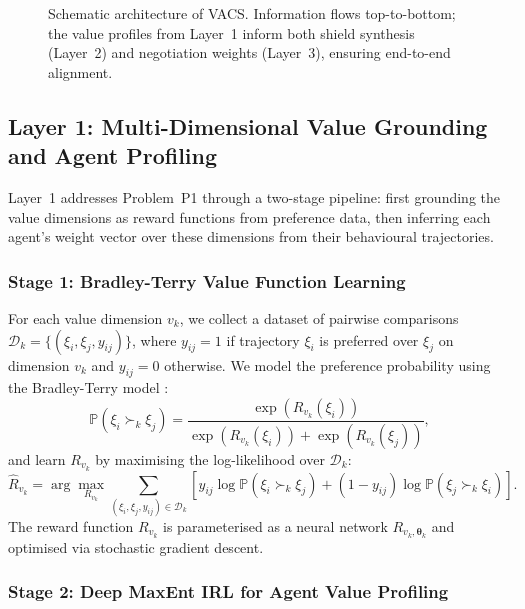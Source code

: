 \documentclass[12pt,a4paper]{article}
\newcommand{\Prob}{\mathbb{P}}
\newcommand{\calD}{\mathcal{D}}
\newcommand{\btheta}{\bm{\theta}}
\begin{document}
\begin{figure}[htbp]
\begin{tikzpicture}
  \end{tikzpicture}
  \caption{Schematic architecture of VACS. Information flows top-to-bottom; the value profiles from Layer~1 inform both shield synthesis (Layer~2) and negotiation weights (Layer~3), ensuring end-to-end alignment.}
  \label{fig:vacs_architecture}
\end{figure}

\subsection{Layer 1: Multi-Dimensional Value Grounding and Agent Profiling}
\label{sec:layer1}

Layer~1 addresses Problem~P1 through a two-stage pipeline: first grounding the value
dimensions as reward functions from preference data, then inferring each agent's weight
vector over these dimensions from their behavioural trajectories.

\subsubsection{Stage 1: Bradley-Terry Value Function Learning}

For each value dimension $v_k$, we collect a dataset of pairwise comparisons
$\calD_k = \{(\xi_i, \xi_j, y_{ij})\}$, where $y_{ij} = 1$ if trajectory $\xi_i$ is
preferred over $\xi_j$ on dimension $v_k$ and $y_{ij} = 0$ otherwise. We model the
preference probability using the Bradley-Terry model \citep{bradley1952rank}:
\begin{equation}
  \Prob(\xi_i \succ_k \xi_j) = \frac{\exp(R_{v_k}(\xi_i))}{\exp(R_{v_k}(\xi_i)) +
  \exp(R_{v_k}(\xi_j))},
  \label{eq:bradley_terry}
\end{equation}
and learn $R_{v_k}$ by maximising the log-likelihood over $\calD_k$:
\begin{equation}
  \hat{R}_{v_k} = \arg\max_{R_{v_k}} \sum_{(\xi_i, \xi_j, y_{ij}) \in \calD_k}
  \left[y_{ij} \log \Prob(\xi_i \succ_k \xi_j) + (1-y_{ij}) \log \Prob(\xi_j \succ_k
  \xi_i)\right].
  \label{eq:bt_mle}
\end{equation}
The reward function $R_{v_k}$ is parameterised as a neural network $R_{v_k,\btheta_k}$
and optimised via stochastic gradient descent.

\subsubsection{Stage 2: Deep MaxEnt IRL for Agent Value Profiling}
\end{document}
